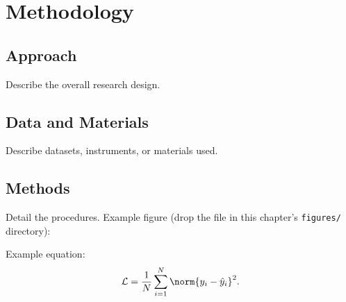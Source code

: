 \chapter{Methodology}
\label{ch:methodology}

\section{Approach}
\label{sec:method-approach}

Describe the overall research design.

\section{Data and Materials}
\label{sec:method-data}

Describe datasets, instruments, or materials used.

\section{Methods}
\label{sec:method-methods}

Detail the procedures. Example figure (drop the file in this chapter's
\texttt{figures/} directory):


Example equation:
\begin{equation}
  \label{eq:loss}
  \mathcal{L} = \frac{1}{N}\sum_{i=1}^{N} \norm{y_i - \hat{y}_i}^2 .
\end{equation}
